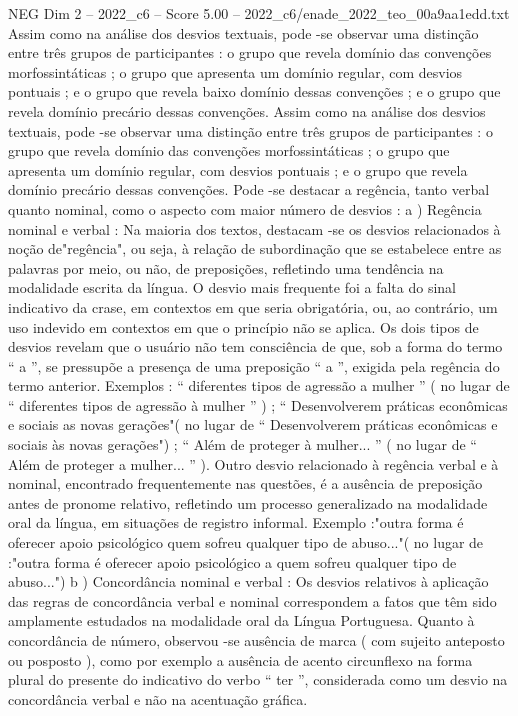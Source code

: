 \begin{textsample}{NEG Dim 2 – 2022\_c6 – Score 5.00 – 2022\_c6/enade\_2022\_teo\_00a9aa1edd.txt}
Assim como na análise dos desvios textuais, pode -se observar uma distinção entre três grupos de participantes : o grupo que revela domínio das convenções morfossintáticas ; o grupo que apresenta um domínio regular, com desvios pontuais ; e o grupo que revela baixo domínio dessas convenções ; e o grupo que revela domínio precário dessas convenções.
Assim como na análise dos desvios textuais, pode -se observar uma distinção entre três grupos de participantes : o grupo que revela domínio das convenções morfossintáticas ; o grupo que apresenta um domínio regular, com desvios pontuais ; e o grupo que revela domínio precário dessas convenções.
Pode -se destacar a regência, tanto verbal quanto nominal, como o aspecto com maior número de desvios : a ) Regência nominal e verbal : Na maioria dos textos, destacam -se os desvios relacionados à noção de"regência", ou seja, à relação de subordinação que se estabelece entre as palavras por meio, ou não, de preposições, refletindo uma tendência na modalidade escrita da língua.
O desvio mais frequente foi a falta do sinal indicativo da crase, em contextos em que seria obrigatória, ou, ao contrário, um uso indevido em contextos em que o princípio não se aplica.
Os dois tipos de desvios revelam que o usuário não tem consciência de que, sob a forma do termo “ a ”, se pressupõe a presença de uma preposição “ a ”, exigida pela regência do termo anterior.
Exemplos : “ diferentes tipos de agressão a mulher ” ( no lugar de “ diferentes tipos de agressão à mulher ” ) ; “ Desenvolverem práticas econômicas e sociais as novas gerações"( no lugar de “ Desenvolverem práticas econômicas e sociais às novas gerações") ; “ Além de proteger à mulher... ” ( no lugar de “ Além de proteger a mulher... ” ).
Outro desvio relacionado à regência verbal e à nominal, encontrado frequentemente nas questões, é a ausência de preposição antes de pronome relativo, refletindo um processo generalizado na modalidade oral da língua, em situações de registro informal.
Exemplo :"outra forma é oferecer apoio psicológico quem sofreu qualquer tipo de abuso..."( no lugar de :"outra forma é oferecer apoio psicológico a quem sofreu qualquer tipo de abuso...") b ) Concordância nominal e verbal : Os desvios relativos à aplicação das regras de concordância verbal e nominal correspondem a fatos que têm sido amplamente estudados na modalidade oral da Língua Portuguesa.
Quanto à concordância de número, observou -se ausência de marca ( com sujeito anteposto ou posposto ), como por exemplo a ausência de acento circunflexo na forma plural do presente do indicativo do verbo “ ter ”, considerada como um desvio na concordância verbal e não na acentuação gráfica.

\end{textsample}
